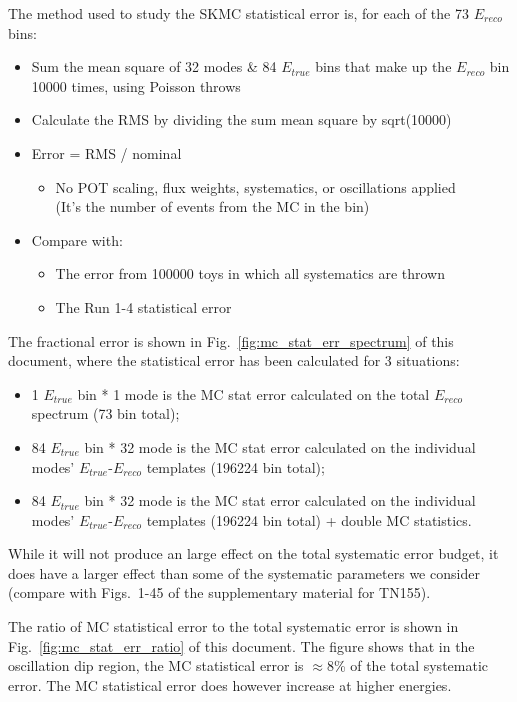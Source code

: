 \begin{enumerate}
  The method used to study the SKMC statistical error is, for each of the 73 $E_{reco}$ bins:
  \begin{itemize}
  \item Sum the mean square of 32 modes \& 84 $E_{true}$ bins that make
    up the $E_{reco}$ bin 10000 times, using Poisson throws
  \item Calculate the RMS by dividing the sum mean square by sqrt(10000)
  \item Error = RMS / nominal
    \begin{itemize}
    \item No POT scaling, flux weights, systematics, or oscillations applied
      \\(It's the number of events from the MC in the bin)
    \end{itemize}
  \item Compare with:
    \begin{itemize}
    \item The error from 100000 toys in which all systematics are thrown
    \item The Run 1-4 statistical error
    \end{itemize}
  \end{itemize}
  The fractional error is shown in Fig.\ \ref{fig:mc_stat_err_spectrum} of this document, where the statistical error has been calculated for 3 situations:
  \begin{itemize}
  \item 1 $E_{true}$ bin * 1 mode is the MC stat error calculated on the total $E_{reco}$ spectrum (73 bin total);
  \item 84 $E_{true}$ bin * 32 mode is the MC stat error calculated on the individual modes' $E_{true}$-$E_{reco}$ templates (196224 bin total);
  \item 84 $E_{true}$ bin * 32 mode is the MC stat error calculated on the individual modes' $E_{true}$-$E_{reco}$ templates (196224 bin total) + double MC statistics.
  \end{itemize}
  While it will not produce an large effect on the total systematic error budget,
  it does have a larger effect than some of the systematic parameters we consider
  (compare with Figs.\ 1-45 of the supplementary material for TN155).

  The ratio of MC statistical error to the total systematic error is shown in Fig.\ \ref{fig:mc_stat_err_ratio}
  of this document.
  The figure shows that in the oscillation dip region, the MC statistical error is $\approx$8\% of the total
  systematic error.
  The MC statistical error does however increase at higher energies.


\end{enumerate}
